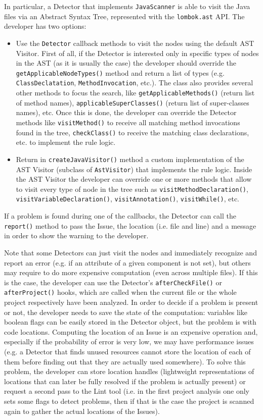 \documentclass[11pt,a4paper,notitlepage]{article}
\begin{document}
In particular, a Detector that implements \texttt{JavaScanner} is able to visit the Java files via an Abstract Syntax Tree, represented with the \texttt{lombok.ast} API. The developer has two options:
\begin{itemize}
	\item Use the \texttt{Detector} callback methods to visit the nodes using the default AST Visitor. First of all, if the Detector is interested only in specific types of nodes in the AST (as it is usually the case) the developer should override the \texttt{getApplicableNodeTypes()} method and return a list of types (e.g. \texttt{ClassDeclatation}, \texttt{MethodInvocation}, etc.). The class also provides several other methods to focus the search, like \texttt{getApplicableMethods()} (return list of method names), \texttt{applicableSuperClasses()} (return list of super-classes names), etc. Once this is done, the developer can override the Detector methods like \texttt{visitMethod()} to receive all matching method invocations found in the tree, \texttt{checkClass()} to receive the matching class declarations, etc. to implement the rule logic.
	\item Return in \texttt{createJavaVisitor()} method a custom implementation of the AST Visitor (subclass of \texttt{AstVisitor}) that implements the rule logic. Inside the AST Visitor the developer can override one or more methods that allow to visit every type of node in the tree such as \texttt{visitMethodDeclaration()}, \texttt{visitVariableDeclaration()}, \texttt{visitAnnotation()}, \texttt{visitWhile()}, etc. 
\end{itemize}
If a problem is found during one of the callbacks, the Detector can call the \texttt{report()} method to pass the Issue, the location (i.e. file and line) and a message in order to show the warning to the developer.

Note that some Detectors can just visit the nodes and immediately recognize and report an error (e.g. if an attribute of a given component is not set), but others may require to do more expensive computation (even across multiple files). If this is the case, the developer can use the Detector's \texttt{afterCheckFile()} or \texttt{afterProject()} hooks, which are called when the current file or the whole project respectively have been analyzed. In order to decide if a problem is present or not, the developer needs to save the state of the computation: variables like boolean flags can be easily stored in the Detector object, but the problem is with code locations. Computing the location of an Issue is an expensive operation and, especially if the probability of error is very low, we may have performance issues (e.g. a Detector that finds unused resources cannot store the location of each of them before finding out that they are actually used somewhere). To solve this problem, the developer can store location handles (lightweight representations of locations that can later be fully resolved if the problem is actually present) or request a second pass to the Lint tool (i.e. in the first project analysis one only sets some flags to detect problems, then if that is the case the project is scanned again to gather the actual locations of the Issues).
\end{document}
